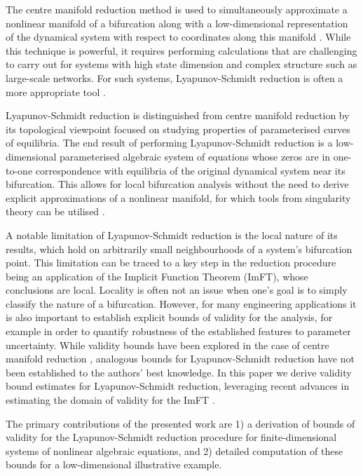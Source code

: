 \documentclass[letterpaper, 10 pt, conference, dvipsnames]{ieeeconf}
\begin{document}
The centre manifold reduction method is used to simultaneously approximate a nonlinear manifold of a bifurcation along with a low-dimensional representation of the dynamical system with respect to coordinates along this manifold \cite[Chapter 3.2]{guckenheimer2013nonlinear}. While this technique is powerful, it requires performing calculations that are challenging to carry out for systems with high state dimension and complex structure such as large-scale networks. For such systems, Lyapunov-Schmidt reduction is often a more appropriate tool
\cite{sidorov2013lyapunov,golubitsky2023dynamics}.

Lyapunov-Schmidt reduction is distinguished from centre manifold reduction by its topological viewpoint focused on studying properties of parameterised curves of equilibria. The end result of performing Lyapunov-Schmidt reduction is a low-dimensional parameterised algebraic system of equations whose zeros are in one-to-one correspondence with equilibria of the original dynamical system near its bifurcation. This allows for local bifurcation analysis without the need to derive explicit approximations of a nonlinear manifold, for which tools from singularity theory can be utilised \cite{Golubitsky1985}.

A notable limitation of Lyapunov-Schmidt reduction is the local nature of its results, which hold on arbitrarily small neighbourhoods of a system's bifurcation point. This limitation can be traced to a key step in the reduction procedure being an application of the Implicit Function Theorem (ImFT), whose conclusions are local. Locality is often not an issue when one's goal is to simply classify the nature of a bifurcation. However, for many engineering applications it is also important to establish explicit bounds of validity for the analysis, for example in order to quantify robustness of the established features to parameter uncertainty. {While validity bounds have been explored in the case of centre manifold reduction \cite{roberts2018backwards}, analogous bounds for Lyapunov-Schmidt reduction have not been established to the authors' best knowledge. In this paper we derive validity bound estimates for Lyapunov-Schmidt reduction, leveraging} recent advances in estimating the domain of validity for the ImFT \cite{jindal2023imft,jindal2023fdbklin}.

The primary contributions of the presented work are 1) a derivation of bounds of validity for the Lyapunov-Schmidt reduction procedure for finite-dimensional systems of nonlinear algebraic equations, and 2) detailed computation of these bounds for a low-dimensional illustrative example.
\end{document}
